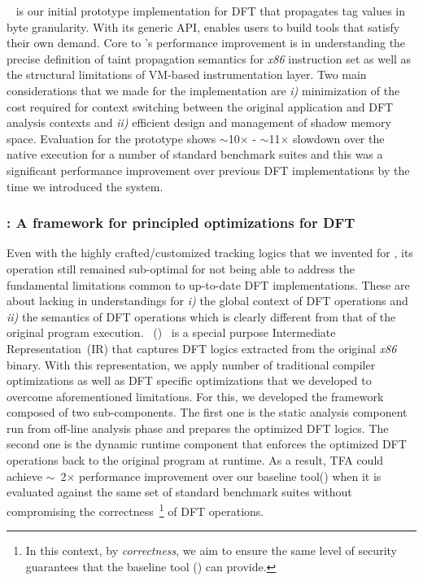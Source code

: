 \documentclass[letterpaper, 10pt]{article}
\begin{document}
\begin{small}
\libdft~\cite{libdft:2012vee} is our initial prototype implementation for DFT
that propagates tag values in byte granularity.
%
With its generic API, \libdft enables users to build tools that satisfy their
own demand. 
%
%
Core to \libdft's performance improvement is in understanding the precise
definition of taint propagation semantics for {\it x86} instruction set as well
as the structural limitations of VM-based instrumentation layer. 
%
%
Two main considerations that we made for the implementation are {\it i)}
minimization of the cost required for context switching between the original
application and DFT analysis contexts and {\it ii)} efficient design and
management of shadow memory space.
%
Evaluation for the prototype shows $\sim$10$\times$ - $\sim$11$\times$ slowdown
over the native execution for a number of standard benchmark suites and this
was a significant performance improvement over previous DFT implementations by
the time we introduced the system.

\subsubsection*{\TFA: A framework for principled optimizations for DFT}

Even with the highly crafted/customized tracking logics that we invented for
\libdft, its operation still remained sub-optimal for not being able to address
the fundamental limitations common to up-to-date DFT implementations. 
%
These are about lacking in understandings for {\it i)} the global context of
DFT operations and {\it ii)} the semantics of DFT operations which is clearly
different from that of the original program execution.
%
\TFAFull~(\TFA)~\cite{tfa:2012ndss} is a special purpose Intermediate
Representation~(IR) that captures DFT logics extracted from the original {\it
x86} binary. With this representation, we apply number of traditional compiler
optimizations as well as DFT specific optimizations that we developed to
overcome aforementioned limitations.
%
For this, we developed the framework composed of two sub-components. The first
one is the static analysis component run from off-line analysis phase and
prepares the optimized DFT logics. The second one is the dynamic runtime
component that enforces the optimized DFT operations back to the original
program at runtime.
%
%
As a result, TFA could achieve \(\sim\)~2\(\times\) performance improvement
over  our baseline tool(\libdft) when it is evaluated against the same set of
standard benchmark suites without compromising the correctness~\footnote{In
        this context, by {\it correctness}, we aim to ensure the same level of
security guarantees that the baseline tool (\libdft) can provide.} of DFT
operations.


\end{small}
\end{document}
